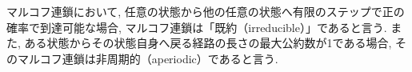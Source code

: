 \documentclass[a4j]{jsarticle}
\begin{document}
 マルコフ連鎖において, 任意の状態から他の任意の状態へ有限のステップで正の確率で到達可能な場合, マルコフ連鎖は「既約（irreducible）」であると言う. また, ある状態からその状態自身へ戻る経路の長さの最大公約数が1である場合, そのマルコフ連鎖は非周期的（aperiodic）であると言う.
\end{document}
